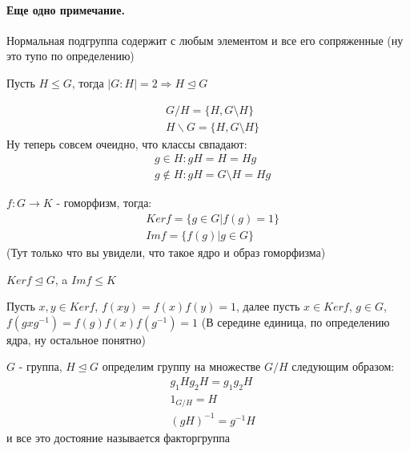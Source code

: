 \paragraph{Еще одно примечание.} Нормальная подгруппа содержит с любым элементом и все его сопряженные (ну это тупо по определению)

\begin{Th}
Пусть $H \le G$, тогда $\left|G : H\right| = 2 \Rightarrow H \trianglelefteq G$
\end{Th}

\begin{Proof}
\[
	\begin{split}
		& G / H = \{H, G \setminus H\} \\
		& H \backslash G = \{H, G \setminus H\}
	\end{split}
\]
Ну теперь совсем очеидно, что классы свпадают:
\[
	\begin{split}
		& g \in H: gH = H = Hg\\
		& g \not\in H : gH = G \setminus H = Hg
	\end{split}
\]
\end{Proof}

\begin{Def}
$f : G \rightarrow K$ - гоморфизм, тогда:
\[
	\begin{split}
	& Ker f = \{g \in G | f\left(g \right) = 1\} \\
	& Im f = \{f\left( g \right) | g \in G \}
	\end{split}
\]
(Тут только что вы увидели, что такое ядро и образ гоморфизма)
\end{Def}

\begin{Th}
$Ker f \trianglelefteq G$, a $Im f \le K$
\end{Th}

\begin{Proof}
Пусть $x,y \in Ker f$, $f\left(xy\right) = f\left(x\right) f\left(y\right) = 1$, далее пусть $x \in Ker f$, $g \in G$, $f\left(gxg^{-1}\right) = f\left(g\right) f\left(x\right) f\left(g^{-1}\right) = 1$ (В середине единица, по определению ядра, ну остальное понятно)
\end{Proof}

\begin{Def}
$G$ - группа, $H \trianglelefteq G$ определим группу на множестве $G / H$ следующим образом:
\[
	\begin{split}
		& g_1 H g_2 H = g_1 g_2 H \\
		& 1_{G/H} = H \\
		& {\left(gH\right)}^{-1} = g^{-1}H
	\end{split}
\]
и все это достояние называется факторгруппа
\end{Def}

